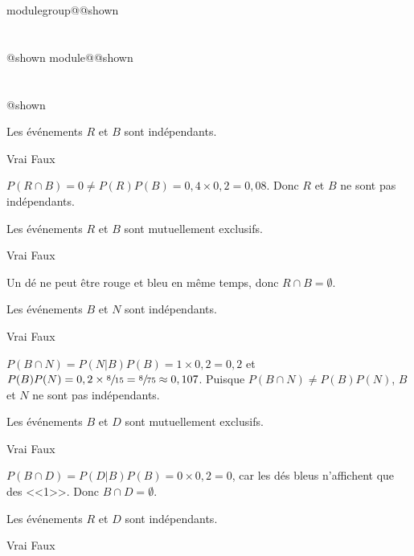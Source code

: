 \documentclass{Evaluation}
\makeatletter
\newcommand{\currentmodulekey}{}
\newcommand{\currentmoduletitle}{}
\newcommand{\currentgroupkey}{}
\newcommand{\currentgrouptitle}{}
\newcommand{\showmoduleifneeded}{%
  \ifx\currentgroupkey\empty\else
    \expandafter\ifx\csname modulegroup@\currentgroupkey @shown\endcsname\relax
      \section*{\currentgrouptitle}%
      \expandafter\gdef\csname modulegroup@\currentgroupkey @shown\endcsname{1}%
    \fi
  \fi
  \expandafter\ifx\csname module@\currentmodulekey @shown\endcsname\relax
    \section*{\currentmoduletitle}%
    \expandafter\gdef\csname module@\currentmodulekey @shown\endcsname{1}%
  \fi
}
\newenvironment{H26}{\showmoduleifneeded}{}
\makeatother
\begin{document}
\begin{questions}
\begin{H26}
\begin{parts}
\begin{subparts}
    \subpart Les événements $R$ et $B$ sont indépendants.

\begin{oneparcheckboxes}
    \choice Vrai
    \correctchoice Faux
\end{oneparcheckboxes}

\begin{solution}
    $P(R \cap B) = 0 \neq P(R)P(B) = 0,4 \times 0,2 = 0,08$. Donc $R$ et $B$ ne sont pas indépendants.
\end{solution}

    \subpart Les événements $R$ et $B$ sont mutuellement exclusifs.

\begin{oneparcheckboxes}
    \correctchoice Vrai
    \choice Faux
\end{oneparcheckboxes}

\begin{solution}
    Un dé ne peut être rouge et bleu en même temps, donc $R \cap B = \emptyset$.
\end{solution}

    \subpart Les événements $B$ et $N$ sont indépendants.

\begin{oneparcheckboxes}
    \choice Vrai
    \correctchoice Faux
\end{oneparcheckboxes}

\begin{solution}
    $P(B \cap N) = P(N|B)P(B) = 1 \times 0,2 = 0,2$ et $P(B)P(N) = 0,2 \times \sfrac{8}{15} = \sfrac{8}{75} \approx 0,107$. Puisque $P(B \cap N) \neq P(B)P(N)$, $B$ et $N$ ne sont pas indépendants.
\end{solution}

    \subpart Les événements $B$ et $D$ sont mutuellement exclusifs.

\begin{oneparcheckboxes}
    \correctchoice Vrai
    \choice Faux
\end{oneparcheckboxes}

\begin{solution}
    $P(B \cap D) = P(D|B)P(B) = 0 \times 0,2 = 0$, car les dés bleus n'affichent que des <<1>>. Donc $B \cap D = \emptyset$.
\end{solution}

    \subpart Les événements $R$ et $D$ sont indépendants.

\begin{oneparcheckboxes}
    \choice Vrai
    \correctchoice Faux
\end{oneparcheckboxes}


\end{subparts}
\end{parts}
\end{H26}
\end{questions}
\end{document}
